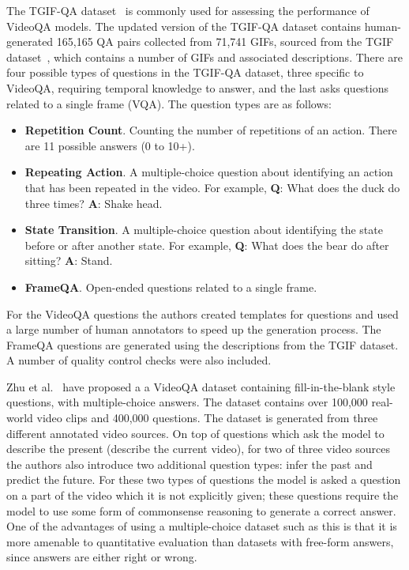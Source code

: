 \documentclass[../interim.tex]{subfiles}
\begin{document}
The TGIF-QA dataset~\cite{dataset:tgif-qa} is commonly used for assessing the performance of VideoQA models. The updated version of the TGIF-QA dataset contains human-generated 165,165 QA pairs collected from 71,741 GIFs, sourced from the TGIF dataset~\cite{dataset:tgif}, which contains a number of GIFs and associated descriptions. There are four possible types of questions in the TGIF-QA dataset, three specific to VideoQA, requiring temporal knowledge to answer, and the last asks questions related to a single frame (VQA). The question types are as follows:
\begin{itemize}
  \item \textbf{Repetition Count}. Counting the number of repetitions of an action. There are 11 possible answers (0 to 10+).

  \item \textbf{Repeating Action}. A multiple-choice question about identifying an action that has been repeated in the video. For example, \textbf{Q}: What does the duck do three times? \textbf{A}: Shake head.

  \item \textbf{State Transition}. A multiple-choice question about identifying the state before or after another state. For example, \textbf{Q}: What does the bear do after sitting? \textbf{A}: Stand.

  \item \textbf{FrameQA}. Open-ended questions related to a single frame.
\end{itemize}

For the VideoQA questions the authors created templates for questions and used a large number of human annotators to speed up the generation process. The FrameQA questions are generated using the descriptions from the TGIF dataset. A number of quality control checks were also included.

Zhu et al.~\cite{dataset:zhu} have proposed a a VideoQA dataset containing fill-in-the-blank style questions, with multiple-choice answers. The dataset contains over 100,000 real-world video clips and 400,000 questions. The dataset is generated from three different annotated video sources. On top of questions which ask the model to describe the present (describe the current video), for two of three video sources the authors also introduce two additional question types: infer the past and predict the future. For these two types of questions the model is asked a question on a part of the video which it is not explicitly given; these questions require the model to use some form of commonsense reasoning to generate a correct answer. One of the advantages of using a multiple-choice dataset such as this is that it is more amenable to quantitative evaluation than datasets with free-form answers, since answers are either right or wrong.
\end{document}
